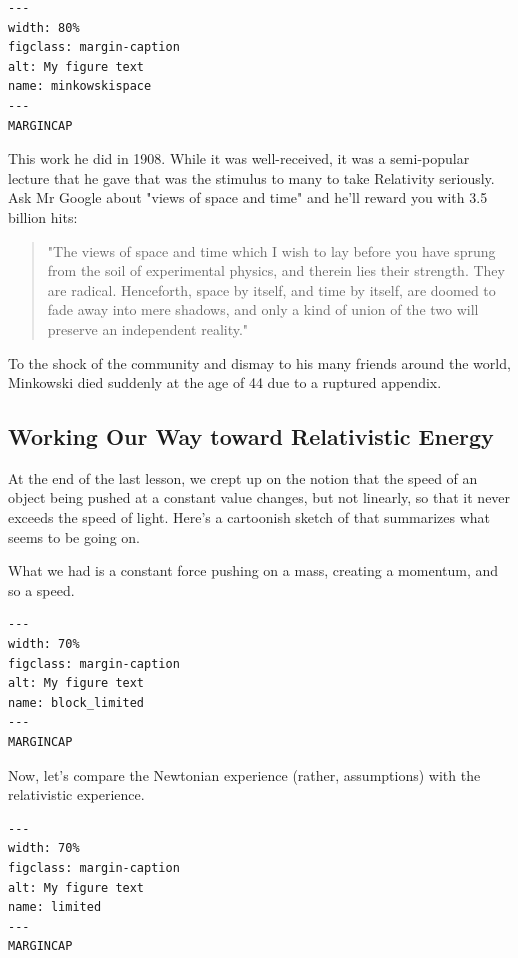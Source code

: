 \documentclass[
]{article}
\begin{document}
\begin{verbatim}
---
width: 80%
figclass: margin-caption
alt: My figure text
name: minkowskispace
---
MARGINCAP
\end{verbatim}

This work he did in 1908. While it was well-received, it was a
semi-popular lecture that he gave that was the stimulus to many to take
Relativity seriously. Ask Mr Google about "views of space and time" and
he'll reward you with 3.5 billion hits:

\begin{quote}
"The views of space and time which I wish to lay before you have sprung
from the soil of experimental physics, and therein lies their strength.
They are radical. Henceforth, space by itself, and time by itself, are
doomed to fade away into mere shadows, and only a kind of union of the
two will preserve an independent reality."
\end{quote}

To the shock of the community and dismay to his many friends around the
world, Minkowski died suddenly at the age of 44 due to a ruptured
appendix.

\hypertarget{working-our-way-toward-relativistic-energy}{%
\subsection{Working Our Way toward Relativistic
Energy}\label{working-our-way-toward-relativistic-energy}}

At the end of the last lesson, we crept up on the notion that the speed
of an object being pushed at a constant value changes, but not linearly,
so that it never exceeds the speed of light. Here's a cartoonish sketch
of that summarizes what seems to be going on.

What we had is a constant force pushing on a mass, creating a momentum,
and so a speed.

\begin{verbatim}
---
width: 70%
figclass: margin-caption
alt: My figure text
name: block_limited
---
MARGINCAP
\end{verbatim}

Now, let's compare the Newtonian experience (rather, assumptions) with
the relativistic experience.

\begin{verbatim}
---
width: 70%
figclass: margin-caption
alt: My figure text
name: limited
---
MARGINCAP
\end{verbatim}
\end{document}
